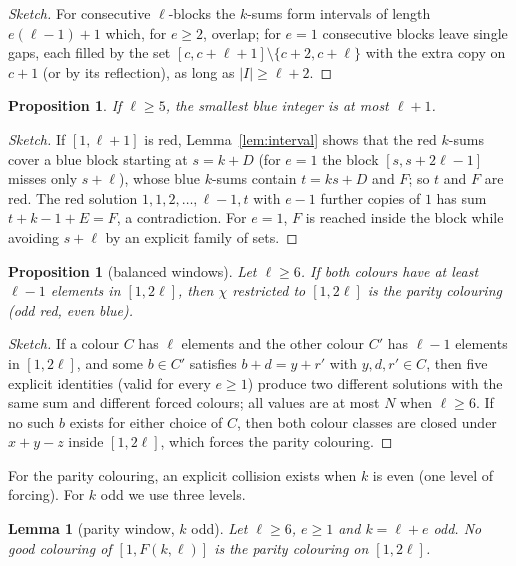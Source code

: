 \documentclass[11pt]{amsart}
\newtheorem{lemma}[theorem]{Lemma}
\newtheorem{proposition}[theorem]{Proposition}
\theoremstyle{definition}
\newcommand{\F}{F}
\begin{document}
\begin{proof}[Sketch]
For consecutive $\ell$-blocks the $k$-sums form intervals of length $e(\ell-1)+1$ which, for $e\ge2$, overlap; for $e=1$ consecutive blocks leave single gaps, each filled by the set $[c,c+\ell+1]\setminus\{c+2,c+\ell\}$ with the extra copy on $c+1$ (or by its reflection), as long as $|I|\ge\ell+2$.
\end{proof}

\begin{proposition}\label{prop:smallblue}
If $\ell\ge5$, the smallest blue integer is at most $\ell+1$.
\end{proposition}

\begin{proof}[Sketch]
If $[1,\ell+1]$ is red, Lemma~\ref{lem:interval} shows that the red $k$-sums cover a blue block starting at $s=k+D$ (for $e=1$ the block $[s,s+2\ell-1]$ misses only $s+\ell$), whose blue $k$-sums contain $t=ks+D$ and $\F$; so $t$ and $\F$ are red. The red solution $1,1,2,\dots,\ell-1,t$ with $e-1$ further copies of $1$ has sum $t+k-1+E=\F$, a contradiction. For $e=1$, $\F$ is reached inside the block while avoiding $s+\ell$ by an explicit family of sets.
\end{proof}

\begin{proposition}[balanced windows]\label{prop:balanced}
Let $\ell\ge6$. If both colours have at least $\ell-1$ elements in $[1,2\ell]$, then $\chi$ restricted to $[1,2\ell]$ is the parity colouring (odd red, even blue).
\end{proposition}

\begin{proof}[Sketch]
If a colour $C$ has $\ell$ elements and the other colour $C'$ has $\ell-1$ elements in $[1,2\ell]$, and some $b\in C'$ satisfies $b+d=y+r'$ with $y,d,r'\in C$, then five explicit identities (valid for every $e\ge1$) produce two different solutions with the same sum and different forced colours; all values are at most $N$ when $\ell\ge6$. If no such $b$ exists for either choice of $C$, then both colour classes are closed under $x+y-z$ inside $[1,2\ell]$, which forces the parity colouring.
\end{proof}

\noindent For the parity colouring, an explicit collision exists when $k$ is even (one level of forcing). For $k$ odd we use three levels.

\begin{lemma}[parity window, $k$ odd]\label{lem:parityodd}
Let $\ell\ge6$, $e\ge1$ and $k=\ell+e$ odd. No good colouring of $[1,\F(k,\ell)]$ is the parity colouring on $[1,2\ell]$.
\end{lemma}
\end{document}

